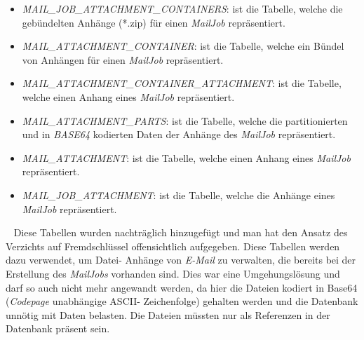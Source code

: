 \begin{itemize}
	\item\emph{MAIL\_JOB\_ATTACHMENT\_CONTAINERS}:
	\newline
	ist die Tabelle, welche die gebündelten Anhänge (*.zip) für einen \emph{MailJob} repräsentiert.
	\item\emph{MAIL\_ATTACHMENT\_CONTAINER}:
	\newline
	ist die Tabelle, welche ein Bündel von Anhängen für einen \emph{MailJob} repräsentiert.
	\item\emph{MAIL\_ATTACHMENT\_CONTAINER\_ATTACHMENT}:
	\newline
	ist die Tabelle, welche einen Anhang eines \emph{MailJob} repräsentiert.
	\item\emph{MAIL\_ATTACHMENT\_PARTS}:
	\newline
	ist die Tabelle, welche die partitionierten und in \emph{BASE64} kodierten Daten der Anhänge des \emph{MailJob} repräsentiert.
	\item\emph{MAIL\_ATTACHMENT}:
	\newline
	ist die Tabelle, welche einen Anhang eines \emph{MailJob} repräsentiert. 
	\item\emph{MAIL\_JOB\_ATTACHMENT}:
	\newline
	ist die Tabelle, welche die Anhänge eines \emph{MailJob} repräsentiert.
\end{itemize}
\ \newline
Diese Tabellen wurden nachträglich hinzugefügt und man hat den Ansatz des Verzichts auf Fremdschlüssel offensichtlich aufgegeben. Diese Tabellen werden dazu verwendet, um Datei- Anhänge von \emph{E-Mail} zu verwalten, die bereits bei der Erstellung des \emph{MailJobs} vorhanden sind. Dies war eine Umgehungslösung und darf so auch nicht mehr angewandt werden, da hier die Dateien kodiert in Base64 (\emph{Codepage} unabhängige ASCII- Zeichenfolge) gehalten werden und die Datenbank unnötig mit Daten belasten. Die Dateien müssten nur als Referenzen in der Datenbank präsent sein.
\ \newpage
